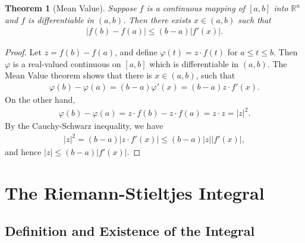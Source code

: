 \documentclass[10pt]{book}
\newtheorem{theorem}{Theorem}[chapter]
\theoremstyle{definition}
\numberwithin{equation}{chapter}
\begin{document}
\medskip

\begin{theorem}[Mean Value]
Suppose $f$ is a continuous mapping of $[a,b]$ into $\mathbb{R}^n$ and $f$ is differentiable in $(a,b)$. Then there exists $x \in (a,b)$ such that
\begin{align*}
    \left|f(b) - f(a)\right| \leq (b - a) \left|f'(x)\right|.
\end{align*}
\end{theorem}
\begin{proof}
Let $z = f(b) - f(a)$, and define $\varphi(t) = z \cdot f(t)$ for $a \leq t \leq b$. Then $\varphi$ is a real-valued continuous on $[a,b]$ which is differentiable in $(a,b)$. The Mean Value theorem shows that there is $x \in (a,b)$, such that
\begin{align*}
    \varphi(b) - \varphi(a) = (b - a) \varphi'(x) = (b - a) z \cdot f'(x).
\end{align*}
On the other hand,
\begin{align*}
    \varphi(b) - \varphi(a) = z \cdot f(b) - z \cdot f(a) = z \cdot z = \left|z\right|^2.
\end{align*}
By the Cauchy-Schwarz inequality, we have
\begin{align*}
    \left|z\right|^2 = (b - a)  \left|z \cdot f'(x)\right| \leq (b - a) \left|z\right| \left|f'(x)\right|,
\end{align*}
and hence $\left|z\right| \leq (b - a) \left|f'(x)\right|$.
\end{proof}







\chapter{The Riemann-Stieltjes Integral}

\section{Definition and Existence of the Integral}
\end{document}
